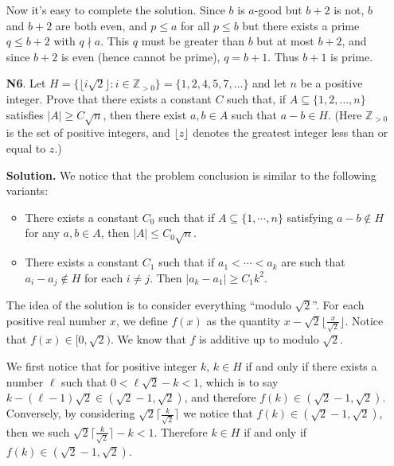 \documentclass[11pt,a4paper]{article}
\begin{document}
\begin{enumerate}
	Now it's easy to complete the solution. Since $b$ is $a$-good but $b+2$ is not, $b$ and $b+2$ are both even, and $p\le a$ for all $p\le b$ but there exists a prime $q\le b+2$ with $q\nmid a$. This $q$ must be greater than $b$ but at most $b+2$, and since $b+2$ is even (hence cannot be prime), $q=b+1$. Thus $b+1$ is prime.
	
	\item[\textbf{N6}.] Let $H = \{ \lfloor i\sqrt{2}\rfloor : i \in \mathbb Z_{>0}\} = \{1,2,4,5,7,\dots \}$ and let $n$ be a positive integer. Prove that there exists a constant $C$ such that, if $A\subseteq \{1,2,\dots, n\}$ satisfies $|A| \ge C\sqrt{n}$, then there exist $a,b\in A$ such that $a-b\in H$. (Here $\mathbb Z_{>0}$ is the set of positive integers, and $\lfloor z\rfloor$ denotes the greatest integer less than or equal to $z$.)
	
	\textbf{Solution.} We notice that the problem conclusion is similar to the following variants: 
	\begin{itemize}
		\item There exists a constant $C_0$ such that if $A\subseteq \{1, \cdots , n\}$ satisfying $a-b\not\in H$ for any $a, b\in A$, then $|A|\le C_0\sqrt{n}$. 
		
		\item There exists a constant $C_1$ such that if $a_1 < \cdots < a_k$ are such that $a_i-a_j\not\in H$ for each $i\neq j$. Then $|a_k-a_1|\ge C_1k^2$. 
	\end{itemize}
	
	The idea of the solution is to consider everything ``modulo $\sqrt{2}$''. For each positive real number $x$, we define $f(x)$ as the quantity $x-\sqrt{2}\lfloor \frac{x}{\sqrt{2}}\rfloor$. Notice that $f(x)\in [0, \sqrt{2})$. We know that $f$ is additive up to modulo $\sqrt{2}$. 
	
	We first notice that for positive integer $k$, $k\in H$ if and only if there exists a number $\ell$ such that $0 < \ell\sqrt{2} - k < 1$, which is to say $k-(\ell - 1)\sqrt{2}\in (\sqrt{2}-1, \sqrt{2})$, and therefore $f(k)\in (\sqrt{2}-1, \sqrt{2})$. Conversely, by considering $\sqrt{2}\lceil\frac{k}{\sqrt{2}}\rceil$ we notice that $f(k)\in (\sqrt{2}-1, \sqrt{2})$, then we such $\sqrt{2}\lceil\frac{k}{\sqrt{2}}\rceil - k < 1$. 
	Therefore $k\in H$ if and only if $f(k)\in (\sqrt{2}-1, \sqrt{2})$. 
	

\end{enumerate}
\end{document}
